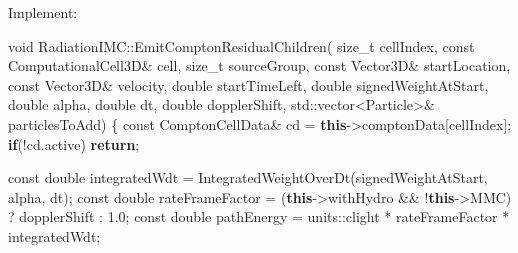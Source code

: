 \documentclass[
]{article}
\newenvironment{Shaded}{}{}
\newcommand{\AttributeTok}[1]{\textcolor[rgb]{0.49,0.56,0.16}{#1}}
\newcommand{\BuiltInTok}[1]{\textcolor[rgb]{0.00,0.50,0.00}{#1}}
\newcommand{\ControlFlowTok}[1]{\textcolor[rgb]{0.00,0.44,0.13}{\textbf{#1}}}
\newcommand{\DataTypeTok}[1]{\textcolor[rgb]{0.56,0.13,0.00}{#1}}
\newcommand{\FloatTok}[1]{\textcolor[rgb]{0.25,0.63,0.44}{#1}}
\newcommand{\KeywordTok}[1]{\textcolor[rgb]{0.00,0.44,0.13}{\textbf{#1}}}
\newcommand{\NormalTok}[1]{#1}
\newcommand{\OperatorTok}[1]{\textcolor[rgb]{0.40,0.40,0.40}{#1}}
\begin{document}
Implement:

\begin{Shaded}
\begin{Highlighting}[]
\DataTypeTok{void}\NormalTok{ RadiationIMC}\OperatorTok{::}\NormalTok{EmitComptonResidualChildren}\OperatorTok{(}
    \DataTypeTok{size\_t}\NormalTok{ cellIndex}\OperatorTok{,}
    \AttributeTok{const}\NormalTok{ ComputationalCell3D}\OperatorTok{\&}\NormalTok{ cell}\OperatorTok{,}
    \DataTypeTok{size\_t}\NormalTok{ sourceGroup}\OperatorTok{,}
    \AttributeTok{const}\NormalTok{ Vector3D}\OperatorTok{\&}\NormalTok{ startLocation}\OperatorTok{,}
    \AttributeTok{const}\NormalTok{ Vector3D}\OperatorTok{\&}\NormalTok{ velocity}\OperatorTok{,}
    \DataTypeTok{double}\NormalTok{ startTimeLeft}\OperatorTok{,}
    \DataTypeTok{double}\NormalTok{ signedWeightAtStart}\OperatorTok{,}
    \DataTypeTok{double}\NormalTok{ alpha}\OperatorTok{,}
    \DataTypeTok{double}\NormalTok{ dt}\OperatorTok{,}
    \DataTypeTok{double}\NormalTok{ dopplerShift}\OperatorTok{,}
    \BuiltInTok{std::}\NormalTok{vector}\OperatorTok{\textless{}}\NormalTok{Particle}\OperatorTok{\textgreater{}\&}\NormalTok{ particlesToAdd}\OperatorTok{)}
\OperatorTok{\{}
    \AttributeTok{const}\NormalTok{ ComptonCellData}\OperatorTok{\&}\NormalTok{ cd }\OperatorTok{=} \KeywordTok{this}\OperatorTok{{-}\textgreater{}}\NormalTok{comptonData}\OperatorTok{[}\NormalTok{cellIndex}\OperatorTok{];}
    \ControlFlowTok{if}\OperatorTok{(!}\NormalTok{cd}\OperatorTok{.}\NormalTok{active}\OperatorTok{)}
        \ControlFlowTok{return}\OperatorTok{;}

    \AttributeTok{const} \DataTypeTok{double}\NormalTok{ integratedWdt }\OperatorTok{=}\NormalTok{ IntegratedWeightOverDt}\OperatorTok{(}\NormalTok{signedWeightAtStart}\OperatorTok{,}\NormalTok{ alpha}\OperatorTok{,}\NormalTok{ dt}\OperatorTok{);}
    \AttributeTok{const} \DataTypeTok{double}\NormalTok{ rateFrameFactor }\OperatorTok{=} \OperatorTok{(}\KeywordTok{this}\OperatorTok{{-}\textgreater{}}\NormalTok{withHydro }\OperatorTok{\&\&} \OperatorTok{!}\KeywordTok{this}\OperatorTok{{-}\textgreater{}}\NormalTok{MMC}\OperatorTok{)} \OperatorTok{?}\NormalTok{ dopplerShift }\OperatorTok{:} \FloatTok{1.0}\OperatorTok{;}
    \AttributeTok{const} \DataTypeTok{double}\NormalTok{ pathEnergy }\OperatorTok{=}\NormalTok{ units}\OperatorTok{::}\NormalTok{clight }\OperatorTok{*}\NormalTok{ rateFrameFactor }\OperatorTok{*}\NormalTok{ integratedWdt}\OperatorTok{;}


\end{Highlighting}
\end{Shaded}
\end{document}
